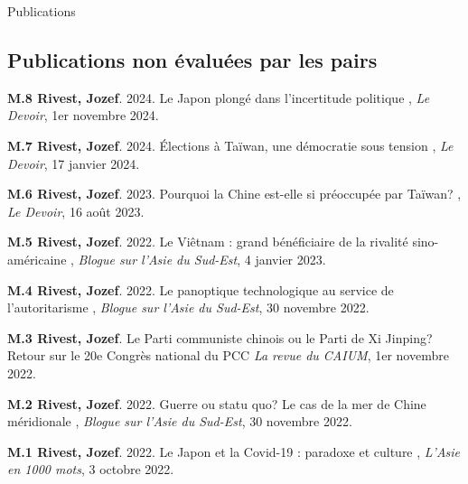 \documentclass{resume} %
\begin{document}
\begin{rSection}{Publications}

	\subsection*{Publications non évaluées par les pairs}

	{\textbf{M.8 Rivest, Jozef}. 2024. \og Le Japon plongé
		dans l'incertitude politique \fg{}, \textit{Le Devoir}, 1er
		novembre 2024.}

	{\textbf{M.7 Rivest, Jozef}. 2024. \og Élections à Taïwan,
		une démocratie sous tension \fg{}, \textit{Le Devoir}, 17 janvier
		2024.} \par

	{\textbf{M.6 Rivest, Jozef}. 2023. \og Pourquoi la Chine
		est-elle si préoccupée par Taïwan? \fg{}, \textit{Le Devoir}, 16
		août 2023.} \par

	{\textbf{M.5 Rivest, Jozef}. 2022. \og Le Viêtnam : grand
		bénéficiaire de la rivalité sino-américaine \fg{}, \textit{Blogue
			sur l'Asie du Sud-Est}, 4 janvier 2023.} \par

	{\textbf{M.4 Rivest, Jozef}. 2022. \og Le panoptique
		technologique au service de l'autoritarisme \fg{}, \textit{Blogue
			sur l'Asie du Sud-Est}, 30 novembre 2022.} \par

	{\textbf{M.3 Rivest, Jozef}. \og Le Parti communiste chinois
		ou le Parti de Xi Jinping? Retour sur le 20e Congrès national
		du PCC \fg{} \textit{La revue du CAIUM}, 1er novembre 2022.}
	\par

	{\textbf{M.2 Rivest, Jozef}. 2022. \og Guerre ou statu
		quo? Le cas de la mer de Chine méridionale \fg{}, \textit{Blogue
			sur l'Asie du Sud-Est}, 30 novembre 2022.} \par

	{\textbf{M.1 Rivest, Jozef}. 2022. \og Le Japon et la
		Covid-19 : paradoxe et culture \fg{}, \textit{L'Asie en 1000
			mots}, 3 octobre 2022.} \par

\end{rSection}

\end{document}
